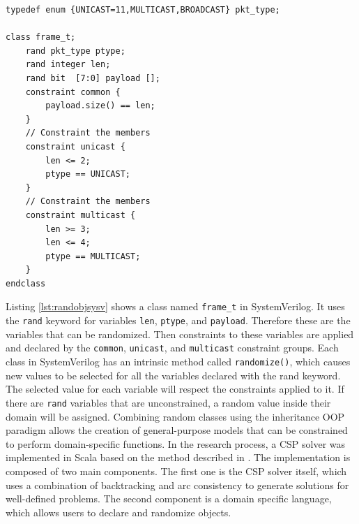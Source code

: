 \documentclass[runningheads]{llncs}
\newcommand{\code}[1]{{\small{\texttt{#1}}}}
\begin{document}
\begin{lstlisting}[caption={Random object in SystemVerilog}, label={lst:randobjsysv}]
typedef enum {UNICAST=11,MULTICAST,BROADCAST} pkt_type;

class frame_t;
    rand pkt_type ptype;
    rand integer len;
    rand bit  [7:0] payload [];
    constraint common {
        payload.size() == len;
    }
    // Constraint the members
    constraint unicast {
        len <= 2;
        ptype == UNICAST;
    }
    // Constraint the members
    constraint multicast {
        len >= 3;
        len <= 4;
        ptype == MULTICAST;
    }
endclass
\end{lstlisting}
Listing \ref{lst:randobjsysv} shows a class named \code{frame\_t} in SystemVerilog. It uses the \code{rand} keyword for variables \code{len}, \code{ptype}, and \code{payload}.
Therefore these are the variables that can be randomized. Then constraints to these variables are applied and declared by the \code{common},  \code{unicast},
and \code{multicast} constraint groups. Each class in SystemVerilog has an intrinsic method called \code{randomize()}, which causes new values to be selected
for all the variables declared with the rand keyword. The selected value for each variable will respect the constraints applied to it. If there are
\code{rand} variables that are unconstrained, a random value inside their domain will be assigned. Combining random classes using the inheritance OOP
paradigm allows the creation of general-purpose models that can be constrained to perform domain-specific functions. In the research process, a
CSP solver was implemented in Scala based on the method described in \cite{russell2002artificial}. The implementation is composed of two main components.
The first one is the CSP solver itself, which uses a combination of backtracking and arc consistency to generate solutions for well-defined problems.
The second component is a domain specific language, which allows users to declare and randomize objects.
\end{document}
